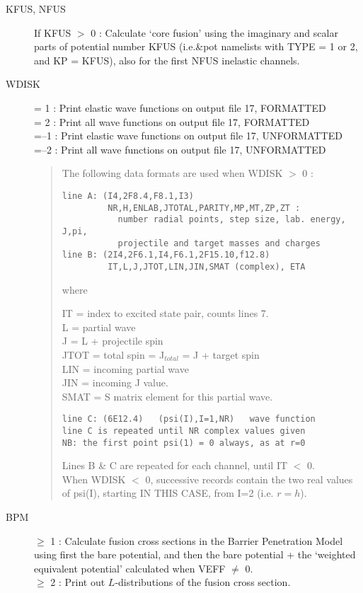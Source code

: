\documentclass[11pt]{article}
\begin{document}
\begin{description}
\item[KFUS, NFUS]
If KFUS  $>$ 0 :  Calculate `core fusion' using the imaginary and scalar
parts of potential number KFUS (i.e.\&pot namelists with TYPE = 1 or 2,
and KP = KFUS), also for the first NFUS inelastic channels.



\item[WDISK]
  = 1 :  Print elastic wave functions on output file 17, FORMATTED
\\  = 2 :  Print   all   wave functions on output file 17, FORMATTED
\\  =--1 :  Print elastic wave functions on output file 17, UNFORMATTED
\\  =--2 :  Print   all   wave functions on output file 17, UNFORMATTED


\begin{quotation}
\noindent
The following data formats are used when WDISK $>$ 0 :
\begin{verbatim}
line A: (I4,2F8.4,F8.1,I3)
         NR,H,ENLAB,JTOTAL,PARITY,MP,MT,ZP,ZT :
           number radial points, step size, lab. energy,  J,pi,
           projectile and target masses and charges
line B: (2I4,2F6.1,I4,F6.1,2F15.10,f12.8)
         IT,L,J,JTOT,LIN,JIN,SMAT (complex), ETA
\end{verbatim}
where

IT = index to excited state pair, counts lines 7.\\
L  = partial wave\\
J  = L + projectile spin\\
JTOT = total spin = J$_{total}$ = J + target spin\\
LIN  = incoming partial wave\\
JIN  = incoming J value.\\
SMAT = S matrix element for this partial wave.\\

\begin{verbatim}
line C: (6E12.4)   (psi(I),I=1,NR)   wave function
line C is repeated until NR complex values given
NB: the first point psi(1) = 0 always, as at r=0
\end{verbatim}
Lines B \& C are repeated for each channel, until IT $<$ 0.
\\
When WDISK $<$ 0, successive records contain the two real values
of psi(I), starting IN THIS CASE, from I=2 (i.e. $r=h$).
\end{quotation}

\item[BPM]
  $\geq$ 1 : Calculate fusion cross sections in the Barrier Penetration
Model using first the bare potential, and then the bare potential + the
`weighted equivalent potential' calculated when VEFF $\neq$ 0.
\\  $\geq$ 2 : Print out $L$-distributions of the fusion cross section.


\end{description}
\end{document}

